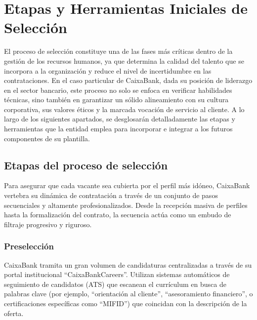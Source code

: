 
\section{Etapas y Herramientas Iniciales de Selección}

El proceso de selección constituye una de las fases más críticas dentro de la gestión de los recursos humanos, ya que determina la calidad del talento que se incorpora a la organización y reduce el nivel de incertidumbre en las contrataciones. En el caso particular de CaixaBank, dada su posición de liderazgo en el sector bancario, este proceso no solo se enfoca en verificar habilidades técnicas, sino también en garantizar un sólido alineamiento con su cultura corporativa, sus valores éticos y la marcada vocación de servicio al cliente. A lo largo de los siguientes apartados, se desglosarán detalladamente las etapas y herramientas que la entidad emplea para incorporar e integrar a los futuros componentes de su plantilla.

\subsection{Etapas del proceso de selección}

Para asegurar que cada vacante sea cubierta por el perfil más idóneo, CaixaBank vertebra su dinámica de contratación a través de un conjunto de pasos secuenciales y altamente profesionalizados. Desde la recepción masiva de perfiles hasta la formalización del contrato, la secuencia actúa como un embudo de filtraje progresivo y riguroso.

\subsubsection{Preselección}
CaixaBank tramita un gran volumen de candidaturas centralizadas a través de su portal institucional ``CaixaBankCareers''. Utilizan sistemas automáticos de seguimiento de candidatos (ATS) que escanean el currículum en busca de palabras clave (por ejemplo, ``orientación al cliente'', ``asesoramiento financiero'', o certificaciones específicas como ``MIFID'') que coincidan con la descripción de la oferta.

